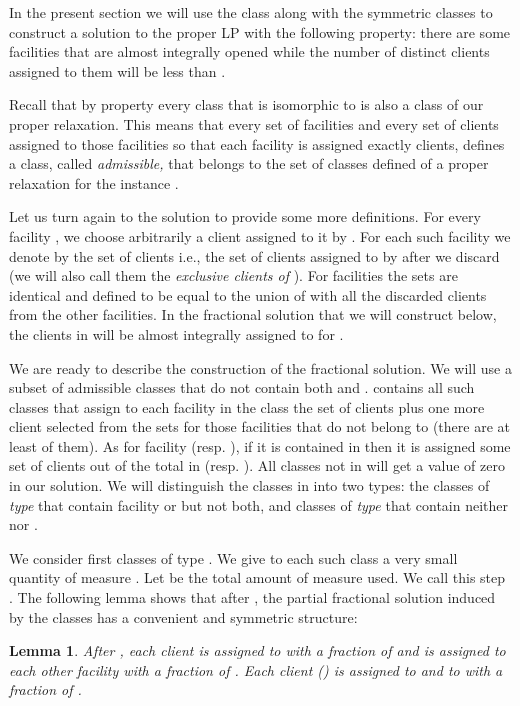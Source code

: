 \documentclass[11pt]{article}
\newtheorem{lemma}{Lemma}[section]
\begin{document}
In the present section we will use the class  along with the
symmetric classes to construct a solution to the proper LP with 
the following
property: there are some   facilities   that
are almost integrally opened while the number of distinct  clients assigned to them will be less than . 

Recall that by property  every class that is isomorphic to  is
also a class of our proper relaxation. This means that
every set  of  facilities and every  set of  clients
assigned to those facilities so that each facility is assigned exactly
 clients, defines a class, called {\em admissible,} that belongs to the set of classes
defined of a  proper relaxation for the instance .

Let  us  turn  again  to  the solution    to  provide  some  more
definitions.  For   every  facility     ,  we  choose
arbitrarily a client  assigned to  it by . For each such facility
  we   denote  by     the  set  of   clients   i.e., the set of clients assigned to
 by  after we discard  (we will also call them the
{\em exclusive clients of }). For facilities   the sets
  are identical  and defined to be equal to 
 the union of  with all
the  discarded clients from  the other  facilities. In  the fractional
solution that we will construct below, the clients in 
will be almost integrally assigned to  for .

We  are   ready  to  describe  the  construction   of  the  fractional
solution. We will use a subset  of admissible classes that 
do not contain both  and  .  contains all such classes   
  that assign to each facility   in the class  the set  of clients   plus  one more
client selected  from the sets   for those facilities
 that do not belong  to  (there are at least 
of them). As for facility  (resp. ), if it  is contained in  then
it is  assigned some set  of  clients  out of the total   in
 (resp. ).  
All classes not in   will get a value
of zero in our solution.
We
will distinguish the classes in  into two types: the classes
of {\em type } that contain facility   or  but not both, and classes
of {\em type } that
 contain neither  nor .

We consider  first classes of type  . We give  to each such class   a
very small  quantity of  measure . Let   be  the total
amount of measure used. We call this step .  The
following  lemma shows  that after  , the  partial fractional
solution  induced  by  the  classes  has a  convenient  and  symmetric
structure:

\begin{lemma}  \label{lemma:roundA}
After  ,  each client      is
assigned to   with a fraction of  and is
assigned to each other facility    with a
fraction of . Each client  ()   is   assigned   to    and to  
 with   a   fraction   of .
\end{lemma}
\end{document}
